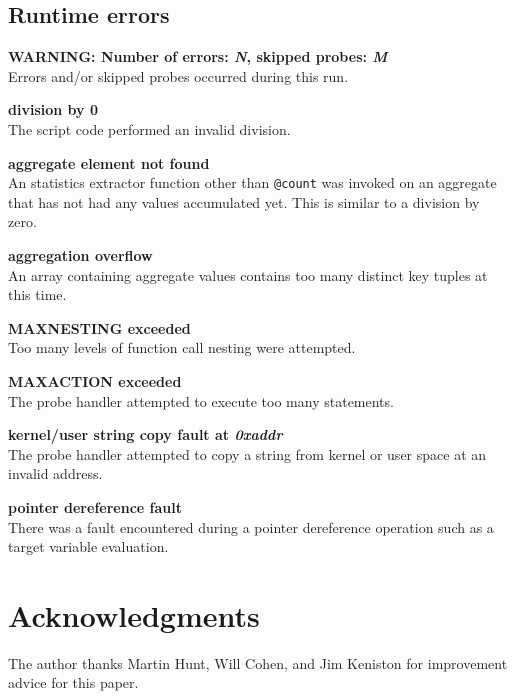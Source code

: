 \documentclass{article}
\renewcommand{\nomenclature}[2]{}
\begin{document}
\subsection{Runtime errors}

\begin{description}

\item{\bf WARNING: Number of errors: {\em N}, skipped probes: {\em M}} \\
Errors and/or skipped probes occurred during this run.
\nomenclature{skipped probe}{A probe handler that should have run but
couldn't, due to contention or temporary resource problems.}

\item{\bf division by 0} \\ The script code performed an invalid
division.

\item{\bf aggregate element not found} \\ An statistics extractor
function other than \verb+@count+ was invoked on an aggregate that has
not had any values accumulated yet.  This is similar to a division by
zero.

\item{\bf aggregation overflow} \\ An array containing aggregate
values contains too many distinct key tuples at this time.

\item{\bf MAXNESTING exceeded} \\ Too many levels of function call nesting
were attempted.

\item{\bf MAXACTION exceeded} \\ The probe handler attempted to execute
too many statements.

\item{\bf kernel/user string copy fault at {\em 0xaddr}} \\
The probe handler attempted to copy a string from kernel or user space
at an invalid address. 

\item{\bf pointer dereference fault} \\ 
There was a fault encountered during a pointer dereference operation such
as a target variable evaluation.

\end{description}


\section{Acknowledgments}

The author thanks Martin Hunt, Will Cohen, and Jim Keniston for
improvement advice for this paper.
\end{document}
